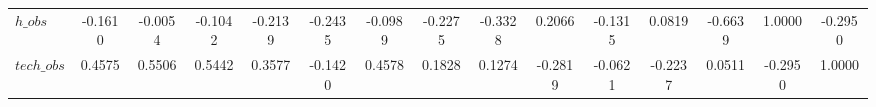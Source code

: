 \begin{center}
\begin{longtable}{lcccccccccccccc}
$h\_obs         $	 & 	          -0.1610	 & 	          -0.0054	 & 	          -0.1042	 & 	          -0.2139	 & 	          -0.2435	 & 	          -0.0989	 & 	          -0.2275	 & 	          -0.3328	 & 	           0.2066	 & 	          -0.1315	 & 	           0.0819	 & 	          -0.6639	 & 	           1.0000	 & 	          -0.2950 \\ 
$tech\_obs      $	 & 	           0.4575	 & 	           0.5506	 & 	           0.5442	 & 	           0.3577	 & 	          -0.1420	 & 	           0.4578	 & 	           0.1828	 & 	           0.1274	 & 	          -0.2819	 & 	          -0.0621	 & 	          -0.2237	 & 	           0.0511	 & 	          -0.2950	 & 	           1.0000 \\ 
\end{longtable}
 \end{center}
